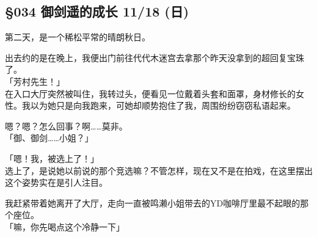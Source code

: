 \subsection{§034 御剑遥的成长 11/18 (日)}

第二天，是一个稀松平常的晴朗秋日。

出去约的是在晚上，我便出门前往代代木迷宫去拿那个昨天没拿到的超回复宝珠了。\\

「芳村先生！」\\

在入口大厅突然被叫住，我转过头，便看见一位戴着头套和面罩，身材修长的女性。我以为她只是向我跑来，可她却顺势抱住了我，周围纷纷窃窃私语起来。

嗯？嗯？怎么回事？啊……莫非。\\

「御、御剑……小姐？」

「嗯！我，被选上了！」\\

选上了，是说她以前说的那个竞选嘛？不管怎样，现在又不是在拍戏，在这里摆出这个姿势实在是引人注目。

我赶紧带着她离开了大厅，走向一直被鸣濑小姐带去的YD咖啡厅里最不起眼的那个座位。\\

「嘛，你先喝点这个冷静一下」\\


